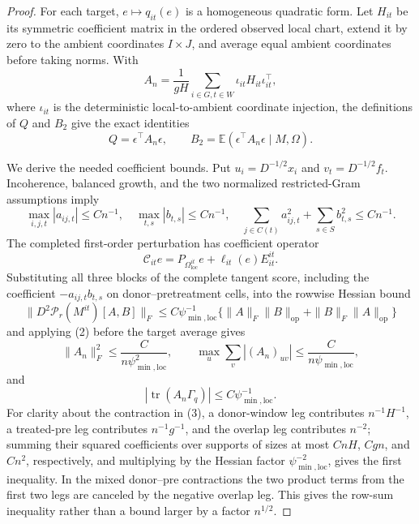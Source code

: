 \documentclass{article}
\begin{document}
\begin{proof}
For each target, \(e\mapsto q_{it}(e)\) is a homogeneous quadratic form.  Let \(H_{it}\) be its symmetric coefficient matrix in the ordered observed local chart, extend it by zero to the ambient coordinates \(I\times J\), and average equal ambient coordinates before taking norms.  With
\[
 A_n=\frac1{gH}\sum_{i\in G,t\in W}\iota_{it}H_{it}\iota_{it}^{\top},
\]
where \(\iota_{it}\) is the deterministic local-to-ambient coordinate injection, the definitions of \(Q\) and \(B_2\) give the exact identities
\[
 Q=\epsilon^{\top}A_n\epsilon,
 \qquad
 B_2=\mathbb E(\epsilon^{\top}A_n\epsilon\mid M,\Omega).
 \tag{1}
\]

We derive the needed coefficient bounds.  Put \(u_i=D^{-1/2}x_i\) and \(v_t=D^{-1/2}f_t\).  Incoherence, balanced growth, and the two normalized restricted-Gram assumptions imply
\[
 \max_{i,j,t}|a_{ij,t}|\le Cn^{-1},
 \quad \max_{t,s}|b_{t,s}|\le Cn^{-1},
 \quad
 \sum_{j\in C(t)}a_{ij,t}^2+
 \sum_{s\in S}b_{t,s}^2\le Cn^{-1}.
 \tag{2}
\]
The completed first-order perturbation has coefficient operator
\[
 \mathcal C_{it}e
 =P_{\Omega_{\mathrm{loc}}^{it}}e
  +\ell_{it}(e)E^{it}_{it}.
\]
Substituting all three blocks of the complete tangent score, including the coefficient \(-a_{ij,t}b_{t,s}\) on donor--pretreatment cells, into the rowwise Hessian bound
\[
 \|D^2\mathcal P_r(M^{it})[A,B]\|_F
 \le C\psi_{\min,\mathrm{loc}}^{-1}
 \{\|A\|_F\|B\|_{\mathrm{op}}+\|B\|_F\|A\|_{\mathrm{op}}\}
\]
and applying (2) before the target average gives
\[
 \|A_n\|_F^2\le\frac{C}{n\psi_{\min,\mathrm{loc}}^2},
 \qquad
 \max_u\sum_v|(A_n)_{uv}|
 \le\frac{C}{n\psi_{\min,\mathrm{loc}}},
 \tag{3}
\]
and
\[
 |\operatorname{tr}(A_n\Gamma_q)|
 \le C\psi_{\min,\mathrm{loc}}^{-1}.
 \tag{4}
\]
For clarity about the contraction in (3), a donor-window leg contributes \(n^{-1}H^{-1}\), a treated-pre leg contributes \(n^{-1}g^{-1}\), and the overlap leg contributes \(n^{-2}\); summing their squared coefficients over supports of sizes at most \(CnH\), \(Cgn\), and \(Cn^2\), respectively, and multiplying by the Hessian factor \(\psi_{\min,\mathrm{loc}}^{-2}\), gives the first inequality.  In the mixed donor--pre contractions the two product terms from the first two legs are canceled by the negative overlap leg.  This gives the row-sum inequality rather than a bound larger by a factor \(n^{1/2}\).


\end{proof}
\end{document}
